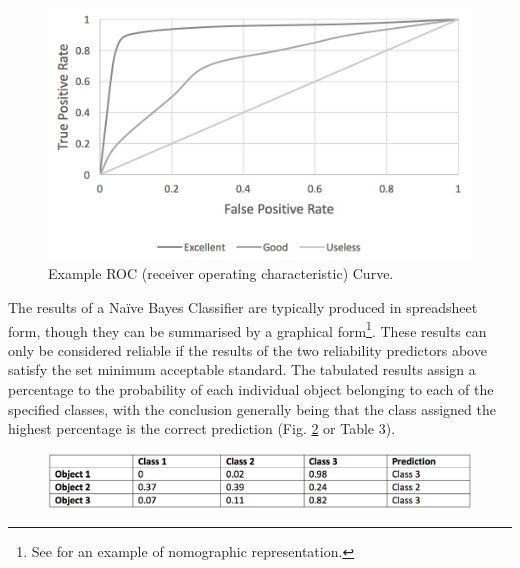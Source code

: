 	\begin{figure}[!htb]
		\includegraphics[width=.85\linewidth]{figures/thoeming_Fig2}
		\centering
		\caption{Example ROC (receiver operating characteristic) Curve.}
		\label{fig:Fig2}
	\end{figure}
	The results of a Naïve Bayes Classifier are typically produced in spreadsheet form, though they can be summarised by a graphical form\footnote{See \textcite[490]{Gansell_2006} for an example of nomographic representation.}. These results can only be considered reliable if the results of the two reliability predictors above satisfy the set minimum acceptable standard. The tabulated results assign a percentage to the probability of each individual object belonging to each of the specified classes, with the conclusion generally being that the class assigned the highest percentage is the correct prediction (Fig. \ref{fig:Table3} or Table 3).
	
	\begin{figure}[!htb]
		\includegraphics[width=.95\linewidth]{figures/thoeming_Table3}
		\centering
		\label{fig:Table3}
	\end{figure}
	

